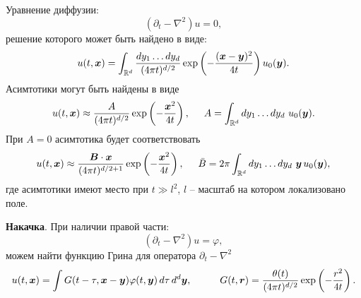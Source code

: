 Уравнение диффузии:
\begin{equation}
    \left(\partial_t - \nabla^2\right) u = 0,
    \label{difeq}
\end{equation}
решение которого может быть найдено в виде:
\begin{equation}
    u(t, \mbox{\boldmath $x$}) = \int_{\mathbb{R}^d} \frac{d y_1 \ldots d y_d}{(4 \pi t)^{d/2}} \exp\left(- \frac{(\mbox{\boldmath $x$}-\mbox{\boldmath $y$})^2}{4 t}\right) u_0(\mbox{\boldmath $y$}).
    \label{difsol}
\end{equation}
Асимтотики могут быть найдены в виде
\begin{equation}
    u(t, \mbox{\boldmath $x$}) \approx \frac{A}{(4 \pi t)^{d/2}} \exp\left(- \frac{\mbox{\boldmath $x$}^2}{4 t}\right),
    \hspace{5 mm} 
    A = \int_{ \mathbb{R}^d} dy_1 \ldots dy_d \ u_0(\mbox{\boldmath $y$}).
    \label{difas1}
\end{equation}
При $A = 0$ асимтотика будет соответствовать
\begin{equation}
    u(t, \mbox{\boldmath $x$}) \approx  \frac{\mbox{\boldmath $B$} \cdot \mbox{\boldmath $x$}}{(4 \pi t)^{d/2+1}} \exp\left(
        - \frac{\mbox{\boldmath $x$}^2}{4 t}
    \right), \hspace{5 mm} 
    \bar{B} = 2 \pi \int_{ \mathbb{R}^d} dy_1 \ldots dy_d \ \mbox{\boldmath $y$}\, u_0(\mbox{\boldmath $y$}),
    \label{difas2}
\end{equation}
где асимтотики имеют место при $t \gg l^2$, $l$ -- масштаб на котором локализовано поле.

\textbf{Накачка}. 
При наличии правой части:
\begin{equation*}
    (\partial_t - \nabla^2) u = \varphi,
\end{equation*}
можем найти функцию Грина для оператора $\partial_t - \nabla^2$
\begin{equation*}
    u(t, \vc{x}) =  \int G(t-\tau, \vc{x}-\vc{y}) \varphi(t, \vc{y}) \d \tau \d^d \vc{y},
    \hspace{10 mm} 
    G(t, \vc{r}) = \frac{\theta(t)}{(4 \pi t)^{d/2}} \exp\left(- \frac{r^2}{4 t}\right).
\end{equation*}
